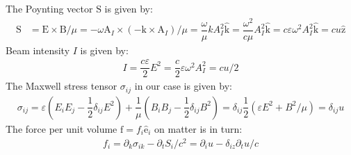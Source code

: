\documentclass[10pt]{article}
\newcommand{\f}[2]{\dfrac{#1}{#2}} %
\newcommand{\p}[1]{\left(#1\right)} %
\renewcommand{\epsilon}{\varepsilon} %
\renewcommand{\v}[1]{\boldsymbol{\mathrm{#1}}} %
\newcommand{\uv}[1]{\hat{\boldsymbol{\mathrm{#1}}}} %
\renewcommand{\d}{\partial} %
\begin{document}
The Poynting vector $\v S$ is given by:
\begin{align*}
  \v S&=\v E\times\v B/\mu =-\omega\v A_I\times\p{-\v k\times\v
    A_I}/\mu =\f\omega\mu kA_I^2\uv k =\f{\omega^2}{c\mu}A_I^2\uv k
  =c\epsilon\omega^2A_I^2\uv k =cu\uv z
\end{align*}
Beam intensity $I$ is given by:
\begin{align*}
  I=\f{c\epsilon}2E^2=\f c2\epsilon\omega^2A_I^2=cu/2
\end{align*}
The Maxwell stress tensor $\sigma_{ij}$ in our case is given by:
\begin{align*}
  \sigma_{ij}=\epsilon\p{E_iE_j-\f12\delta_{ij}E^2}
  +\f1\mu\p{B_iB_j-\f12\delta_{ij}B^2} =\delta_{ij}\f12\p{\epsilon
    E^2+B^2/\mu}=\delta_{ij}u
\end{align*}
The force per unit volume $\v f=f_i\uv e_i$ on matter is in turn:
\begin{align*}
  f_i=\d_k\sigma_{ik}-\d_tS_i/c^2=\d_iu-\delta_{iz}\d_tu/c
\end{align*}
\end{document}
